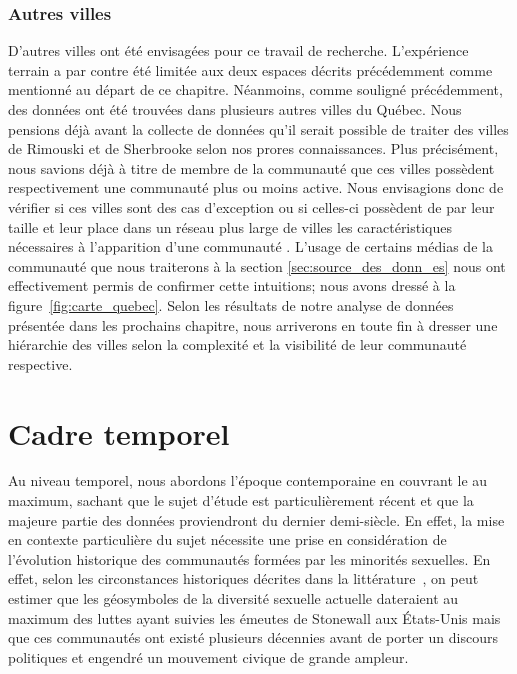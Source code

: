 \subsubsection{Autres villes}
\label{ssub:autres_villes}
D'autres villes ont été envisagées pour ce travail de recherche. 
L'expérience terrain a par contre été limitée aux deux espaces décrits précédemment comme mentionné au départ de ce chapitre. 
Néanmoins, comme souligné précédemment, des données ont été trouvées dans plusieurs autres villes du Québec. 
Nous pensions déjà avant la collecte de données qu'il serait possible de traiter des villes de Rimouski et de Sherbrooke selon nos prores connaissances. 
Plus précisément, nous savions déjà à titre de membre de la communauté \lgbt{} que ces villes possèdent respectivement une communauté plus ou moins active. 
Nous envisagions donc de vérifier si ces villes sont des cas d'exception ou si celles-ci possèdent de par leur taille et leur place dans un réseau plus large de villes les caractéristiques nécessaires à l'apparition d'une communauté \lgbt.
L'usage de certains médias de la communauté que nous traiterons à la section \ref{sec:source_des_donn_es} nous ont effectivement permis de confirmer cette intuitions; nous avons dressé à la figure~\ref{fig:carte_quebec}. 
Selon les résultats de notre analyse de données présentée dans les prochains chapitre, nous arriverons en toute fin à dresser une hiérarchie des villes selon la complexité et la visibilité de leur communauté respective.

\section{Cadre temporel}
\label{sec:cadre_temporel}
Au niveau temporel, nous abordons l'époque contemporaine en couvrant le  au maximum, sachant que le sujet d'étude est particulièrement récent et que la majeure partie des données proviendront du dernier demi-siècle. 
En effet, la mise en contexte particulière du sujet nécessite une prise en considération de l'évolution historique des communautés formées par les minorités sexuelles. 
En effet, selon les circonstances historiques décrites dans la littérature~\citep{Spencer2005}, on peut estimer que les géosymboles de la diversité sexuelle actuelle dateraient au maximum des luttes ayant suivies les émeutes de Stonewall aux États-Unis mais que ces communautés ont existé plusieurs décennies avant de porter un discours politiques et engendré un mouvement civique de grande ampleur.

